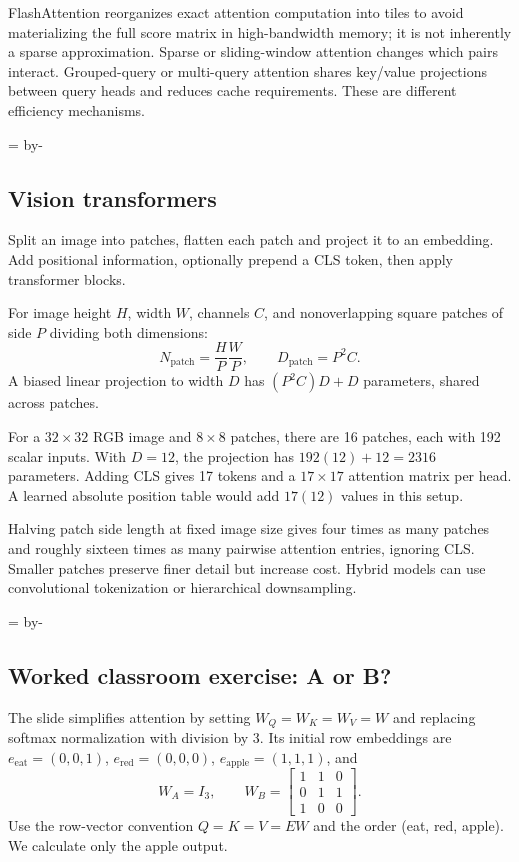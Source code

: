 \documentclass[11pt]{article}
\newcommand{\newsubsection}[1]{\par\begingroup\skip0=\pagegoal\advance\skip0 by-\pagetotal\ifdim\skip0<12\baselineskip\newpage\fi\endgroup\subsection{#1}}
\begin{document}
FlashAttention reorganizes exact attention computation into tiles to avoid materializing the full score matrix in high-bandwidth memory; it is not inherently a sparse approximation. Sparse or sliding-window attention changes which pairs interact. Grouped-query or multi-query attention shares key/value projections between query heads and reduces cache requirements. These are different efficiency mechanisms.

\newsubsection{Vision transformers}
Split an image into patches, flatten each patch and project it to an embedding. Add positional information, optionally prepend a CLS token, then apply transformer blocks.

For image height $H$, width $W$, channels $C$, and nonoverlapping square patches of side $P$ dividing both dimensions:
\[
N_{\mathrm{patch}}=\frac{H}{P}\frac{W}{P},\qquad
D_{\mathrm{patch}}=P^2C.
\]
A biased linear projection to width $D$ has $(P^2C)D+D$ parameters, shared across patches.

For a $32\times32$ RGB image and $8\times8$ patches, there are 16 patches, each with 192 scalar inputs. With $D=12$, the projection has $192(12)+12=2316$ parameters. Adding CLS gives 17 tokens and a $17\times17$ attention matrix per head. A learned absolute position table would add $17(12)$ values in this setup.

Halving patch side length at fixed image size gives four times as many patches and roughly sixteen times as many pairwise attention entries, ignoring CLS. Smaller patches preserve finer detail but increase cost. Hybrid models can use convolutional tokenization or hierarchical downsampling.

\newsubsection{Worked classroom exercise: A or B?}
The slide simplifies attention by setting $W_Q=W_K=W_V=W$ and replacing softmax normalization with division by 3. Its initial row embeddings are
$e_{\mathrm{eat}}=(0,0,1)$, $e_{\mathrm{red}}=(0,0,0)$,
$e_{\mathrm{apple}}=(1,1,1)$, and
\[
W_A=I_3,\qquad
W_B=\begin{bmatrix}1&1&0\\0&1&1\\1&0&0\end{bmatrix}.
\]
Use the row-vector convention $Q=K=V=EW$ and the order (eat, red, apple). We calculate only the apple output.
\end{document}

